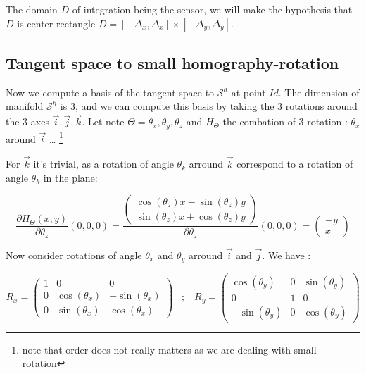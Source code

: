 The domain $D$ of integration being the sensor, we will make the hypothesis that $D$ is center rectangle 
$D = [-\Delta_x,\Delta_x] \times [-\Delta_y,\Delta_y] $.



\subsection{Tangent space to small homography-rotation}

Now we compute a basis of the tangent space to $\mathcal{S}^h$ at point $Id$.
The dimension of manifold $\mathcal{S}^h$ is $3$, and we can compute this basis
by taking the $3$ rotations around the $3$ axes $\vec{i},\vec{j},\vec{k}$.
Let note $\Theta= \theta_x,\theta_y,\theta_z$  and $H_\Theta$ the
combation of $3$ rotation : $\theta_x$ around $\vec{i}$ \dots
\footnote{note that order does not really matters as we are dealing with small rotation}


For $\vec{k}$ it's trivial, as a rotation of angle $\theta_k$ arround 
$\vec{k}$ correspond to a rotation of angle $\theta_k$ in the plane:

\begin{equation}
	\frac{\partial H_\Theta(x,y)}{\partial \theta_z} (0,0,0) 
	= \frac{\begin{pmatrix} \cos(\theta_z) x - \sin(\theta_z)y \\ \sin(\theta_z)x + \cos(\theta_z)y \end{pmatrix}}{\partial \theta_z}  (0,0,0)
	= \begin{pmatrix} -y \\  x \end{pmatrix}
\end{equation}

Now consider  rotations of angle $\theta_x$ and $\theta_y$ arround $\vec{i}$ and $\vec{j}$. We have :

\begin{equation}
	R_x = \begin{pmatrix}  1 & 0 & 0 \\ 0 & \cos(\theta_x) & - \sin(\theta_x) \\ 0 & \sin(\theta_x) &  \cos(\theta_x) \end{pmatrix}
\;\;\;  ; \;\;\;  
	R_y = \begin{pmatrix}  \cos(\theta_y) & 0 &  \sin(\theta_y) \\ 0 & 1 & 0 \\  -\sin(\theta_y) & 0 &  \cos(\theta_y) \end{pmatrix}
\end{equation}

